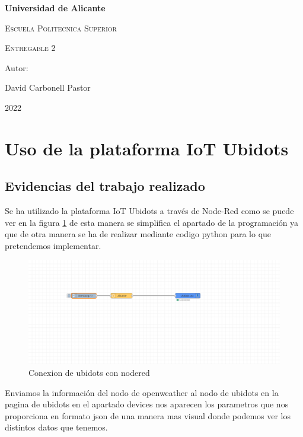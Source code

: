 \documentclass[11pt, letterpaper]{article}
\begin{document}
    
\begin{titlepage}
    \centering
    {\bfseries\LARGE Universidad de Alicante\par}
    \vspace{1cm}
    {\scshape\Large Escuela Politecnica Superior\par}
    \vspace{3cm}
    {\scshape\Huge Entregable 2\par}
    \vspace{3cm}
    \vfill
    {\Large Autor: \par}
    {\Large David Carbonell Pastor \par}
    \vfill
    {\Large 2022\par}
    \end{titlepage} 

\tableofcontents

\pagebreak

\section{Uso de la plataforma IoT Ubidots}
\subsection{Evidencias del trabajo realizado}
Se ha utilizado la plataforma IoT Ubidots a través de Node-Red como se puede ver en la figura \ref{fig:ubidots_nodered}
de esta manera se simplifica el apartado de la programación ya que de otra manera se ha de realizar mediante codigo python para 
lo que pretendemos implementar.
\begin{figure}[h]
    \centering
    \includegraphics[width=\textwidth]{ubidots_nodered.png}
    \caption{Conexion de ubidots con nodered}
    \label{fig:ubidots_nodered}
\end{figure}

Enviamos la información del nodo de openweather al nodo de ubidots 
en la pagina de ubidots en el apartado devices nos aparecen los parametros 
que nos proporciona en formato json de una manera mas visual donde podemos ver los 
distintos datos que tenemos.\\
\end{document}
